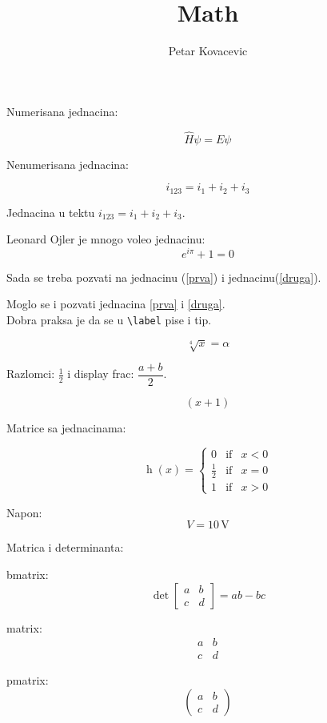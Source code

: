 \documentclass{article}
\title{Math}
\author{Petar Kovacevic}
\begin{document}
\maketitle

\bigskip

Numerisana jednacina:

\begin{equation} \label{prva}
	\hat H \psi = E \psi
\end{equation}

Nenumerisana jednacina:

\begin{equation}
		i_{123} = i_1 + i_2 + i_3  \label{druga}
\end{equation}

Jednacina u tektu $i_{123} = i_1 + i_2 + i_3$.

\clearpage

Leonard Ojler je mnogo voleo jednacinu:
\[ 
		e^{i\pi} + 1 = 0 
\]

Sada se treba pozvati na jednacinu (\ref{prva}) i jednacinu(\ref{druga}).

Moglo se i pozvati jednacina \ref{prva} i \eqref{druga}.\\
Dobra praksa je da se u \verb+\label+ pise i tip.

\[
	\sqrt[4]{x} = \alpha
\]

Razlomci: $\frac{1}{2}$ i display frac: $\dfrac{a+b}{2}$.

\[
	 \left( x + 1 \right)
\]


Matrice sa jednacinama:

\[
		\boxed{
		\operatorname{h}(x) = \left \{ 
		\begin{array}{lll}
				0             & \text{if}        &    x < 0 \\
				\frac{1}{2}   & \text{if}        &    x = 0 \\
				1             & \text{if}        &    x > 0
		\end{array}
	\right.
	}
\]

Napon:
\[
	\boxed{
		V = 10 \, \text{V}
	}
\]

Matrica i determinanta:

bmatrix:
\[
	\det \begin{bmatrix} 
		a & b \\
		c & d 
	\end{bmatrix}
	 = ab - bc 
\]

matrix:
\[
	\begin{matrix}
		a & b\\
			c & d
	\end{matrix}
\]

pmatrix:
\[
	\begin{pmatrix}
			a & b \\
			c & d
	\end{pmatrix}
\]
\end{document}
